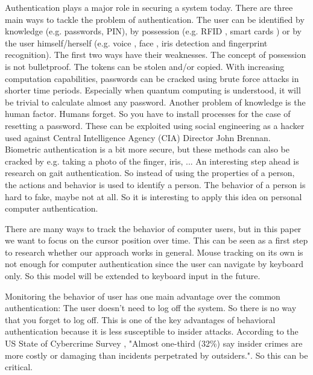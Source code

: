 \documentclass[conference]{IEEEtran}
\begin{document}
Authentication plays a major role in securing a system today. There are three main ways to tackle the problem of authentication. The user can be identified by knowledge (e.g. passwords, PIN), by possession (e.g. RFID \cite{feldhofer2004strong}, smart cards \cite{deo1998authentication}) or by the user himself/herself (e.g. voice \cite{kennedy2000radio}, face \cite{mallauran2005online}, iris \cite{chong2005iris} detection and fingerprint \cite{gupta2005efficient} recognition). \cite{pusara2004user} The first two ways have their weaknesses. The concept of possession is not bulletproof. The tokens can be stolen and/or copied.
With increasing computation capabilities, passwords can be cracked using brute force attacks in shorter time periods. Especially when quantum computing is understood, it will be trivial to calculate almost any password. \cite{steane1998quantum} Another problem of knowledge is the human factor. Humans forget. So you have to install processes for the case of resetting a password. These can be exploited using social engineering as a hacker used against Central Intelligence Agency (CIA) Director John Brennan. \cite{wiredSocialEng} Biometric authentication is a bit more secure, but these methods can also be cracked by e.g. taking a photo of the finger, iris, ...
An interesting step ahead is research on gait authentication. \cite{gafurov2006biometric} So instead of using the properties of a person, the actions and behavior is used to identify a person. The behavior of a person is hard to fake, maybe not at all.
So it is interesting to apply this idea on personal computer authentication.

There are many ways to track the behavior of computer users, but in this paper we want to focus on the cursor position over time. This can be seen as a first step to research whether our approach works in general. Mouse tracking on its own is not enough for computer authentication since the user can navigate by keyboard only. So this model will be extended to keyboard input in the future.

Monitoring the behavior of user has one main advantage over the common authentication: The user doesn't need to log off the system. So there is no way that you forget to log off. This is one of the key advantages of behavioral authentication because it is less susceptible to insider attacks. According to the US State of Cybercrime Survey \cite{us2014us}, "Almost one-third (32\%) say insider crimes are more costly or damaging than incidents perpetrated by outsiders.". So this can be critical.
\end{document}
